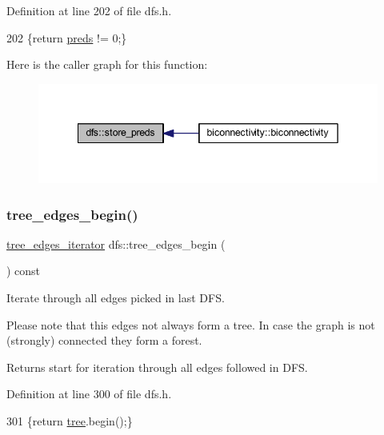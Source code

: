 Definition at line 202 of file dfs.\+h.


\begin{DoxyCode}
202 \{\textcolor{keywordflow}{return} \mbox{\hyperlink{classdfs_a3fdeb5a211a1bc1753b2a637258c5355}{preds}} != 0;\}
\end{DoxyCode}
Here is the caller graph for this function\+:
\nopagebreak
\begin{figure}[H]
\begin{center}
\leavevmode
\includegraphics[width=342pt]{classdfs_ad0233128f2958d630102096aa6f3b9ef_icgraph}
\end{center}
\end{figure}
\mbox{\label{classdfs_afe193938a05b114870c19163731273c8}} 
\subsubsection{\texorpdfstring{tree\+\_\+edges\+\_\+begin()}{tree\_edges\_begin()}}
{\footnotesize\ttfamily \mbox{\hyperlink{classdfs_accde8d5403404f6d22fe4756d4ffedd5}{tree\+\_\+edges\+\_\+iterator}} dfs\+::tree\+\_\+edges\+\_\+begin (\begin{DoxyParamCaption}{ }\end{DoxyParamCaption}) const\hspace{0.3cm}{\ttfamily [inline]}}



Iterate through all edges picked in last D\+FS. 

Please note that this edges not always form a tree. In case the graph is not (strongly) connected they form a forest.

\begin{DoxyReturn}{Returns}
start for iteration through all edges followed in D\+FS. 
\end{DoxyReturn}


Definition at line 300 of file dfs.\+h.


\begin{DoxyCode}
301     \{\textcolor{keywordflow}{return} \mbox{\hyperlink{classdfs_aed496b618a937723bfec0b463e17e8d5}{tree}}.begin();\}
\end{DoxyCode}
\mbox{\label{classdfs_ad1b9f759569cb52ba7ee415862c79831}} 
